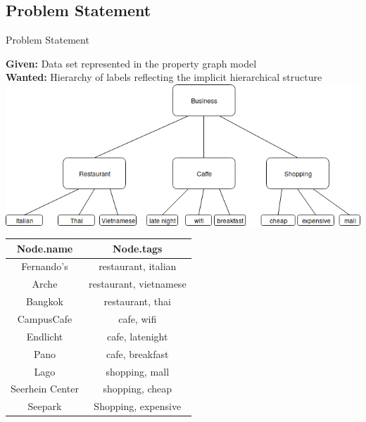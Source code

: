 \documentclass[rgb]{beamer}
\begin{document}
    \subsection{Problem Statement}
    \begin{frame}[fragile]{Problem Statement}
        \begin{multicols}{2}
            \textbf{Given:} Data set represented in the property graph model \\
            \textbf{Wanted:} Hierarchy of labels reflecting the implicit hierarchical structure \\
            \vspace{0.8cm}
            \includegraphics[keepaspectratio,width=\columnwidth]{img/ex_hierarchy.png} \\
            \vfill\null
            \columnbreak
            \begin{tabular}{c c} \toprule
                 Node.name & Node.tags \\ \midrule
                Fernando's & restaurant, italian \\ 
                Arche & restaurant, vietnamese \\ 
                Bangkok & restaurant, thai \\ 
                CampusCafe & cafe, wifi \\ 
                Endlicht & cafe, latenight \\ 
                Pano & cafe, breakfast \\ 
                Lago & shopping, mall \\ 
                Seerhein Center & shopping, cheap \\ 
                Seepark & Shopping, expensive \\ \bottomrule
            \end{tabular}
        \end{multicols}
    \end{frame}
\end{document}
